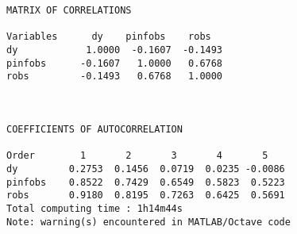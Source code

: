 \documentclass[]{article}
\begin{document}
\begin{verbatim}
MATRIX OF CORRELATIONS

Variables      dy    pinfobs    robs  
dy            1.0000  -0.1607  -0.1493
pinfobs      -0.1607   1.0000   0.6768
robs         -0.1493   0.6768   1.0000



COEFFICIENTS OF AUTOCORRELATION

Order        1       2       3       4       5   
dy         0.2753  0.1456  0.0719  0.0235 -0.0086
pinfobs    0.8522  0.7429  0.6549  0.5823  0.5223
robs       0.9180  0.8195  0.7263  0.6425  0.5691
Total computing time : 1h14m44s
Note: warning(s) encountered in MATLAB/Octave code
\end{verbatim}	
	
	
	
	
	
	
	
	
\end{document}

